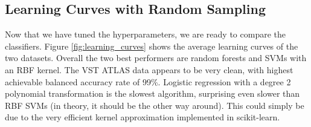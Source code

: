 \subsection{Learning Curves with Random Sampling}
\label{sub:lc}

Now that we have tuned the hyperparameters, we are ready to compare the classifiers. Figure
\ref{fig:learning_curves} shows the average learning curves of the two datasets. Overall the two
best performers are random forests and SVMs with an RBF kernel. The VST ATLAS data appears to be
very clean, with highest achievable balanced accuracy rate of 99\%. Logistic regression with a
degree 2 polynomial transformation is the slowest algorithm, surprising even slower than RBF SVMs
(in theory, it should be the other way around). This could simply be due to the very efficient
kernel approximation implemented in scikit-learn.

